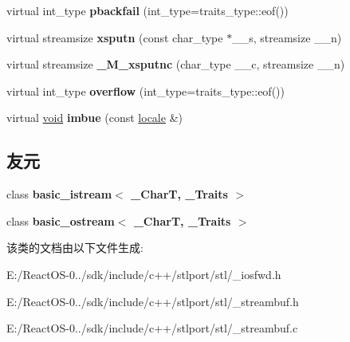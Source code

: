 \begin{DoxyCompactItemize}
virtual int\+\_\+type {\bfseries pbackfail} (int\+\_\+type=traits\+\_\+type\+::eof())
\item 
\mbox{\label{classbasic__streambuf_a2e291c3500330e91d2804732aa7e6378}} 
virtual streamsize {\bfseries xsputn} (const char\+\_\+type $\ast$\+\_\+\+\_\+s, streamsize \+\_\+\+\_\+n)
\item 
\mbox{\label{classbasic__streambuf_a42a6a559f327db707cff30331d9487a5}} 
virtual streamsize {\bfseries \+\_\+\+M\+\_\+xsputnc} (char\+\_\+type \+\_\+\+\_\+c, streamsize \+\_\+\+\_\+n)
\item 
\mbox{\label{classbasic__streambuf_ac38845d71302ed21ca10a618f02c0170}} 
virtual int\+\_\+type {\bfseries overflow} (int\+\_\+type=traits\+\_\+type\+::eof())
\item 
\mbox{\label{classbasic__streambuf_a5d907ab85e8b6f735cae029fe62364c0}} 
virtual \hyperlink{interfacevoid}{void} {\bfseries imbue} (const \hyperlink{classlocale}{locale} \&)
\end{DoxyCompactItemize}
\subsection*{友元}
\begin{DoxyCompactItemize}
\item 
\mbox{\label{classbasic__streambuf_a7740739c36f908f696b86f7503b521bb}} 
class {\bfseries basic\+\_\+istream$<$ \+\_\+\+Char\+T, \+\_\+\+Traits $>$}
\item 
\mbox{\label{classbasic__streambuf_ac6fb84d26ebf75a5954a21092d863248}} 
class {\bfseries basic\+\_\+ostream$<$ \+\_\+\+Char\+T, \+\_\+\+Traits $>$}
\end{DoxyCompactItemize}


该类的文档由以下文件生成\+:\begin{DoxyCompactItemize}
\item 
E\+:/\+React\+O\+S-\/0../sdk/include/c++/stlport/stl/\+\_\+iosfwd.\+h\item 
E\+:/\+React\+O\+S-\/0../sdk/include/c++/stlport/stl/\+\_\+streambuf.\+h\item 
E\+:/\+React\+O\+S-\/0../sdk/include/c++/stlport/stl/\+\_\+streambuf.\+c\end{DoxyCompactItemize}
